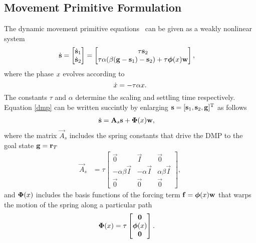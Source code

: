 \subsection{Movement Primitive Formulation}
The dynamic movement primitive equations~\cite{Kober08} can be given as a weakly nonlinear system 
%
\begin{equation}
\begin{aligned}
\dot{\boldsymbol{\mathrm{s}}} &= \begin{bmatrix}
   \dot{\boldsymbol{\mathrm{s}}}_1 \\
   \dot{\boldsymbol{\mathrm{s}}}_2
 \end{bmatrix} = \begin{bmatrix}
    \tau \boldsymbol{\mathrm{s}}_2  \\
    \tau \alpha (\beta(\boldsymbol{\mathrm{g}} - \boldsymbol{\mathrm{s}}_1) - \boldsymbol{\mathrm{s}}_2) + \tau \boldsymbol{\mathrm{\phi}}(x)\boldsymbol{\mathrm{w}}
  \end{bmatrix}
\label{dmp},
\end{aligned}
\end{equation}
%
\noindent where the phase $x$ evolves according to
%
\begin{equation}
\dot{x} = -\tau\alpha x.
\label{phase}
\end{equation}
%
\noindent The constants $\tau$ and $\alpha$ determine the scaling and settling time respectively. Equation \eqref{dmp} can be written succintly by enlarging $\boldsymbol{\mathrm{s}} = [\boldsymbol{\mathrm{s}}_1,\boldsymbol{\mathrm{s}}_2,\boldsymbol{\mathrm{g}}]^{\mathrm{T}}$ as follows
%
\begin{equation}
\begin{aligned}
\dot{\boldsymbol{\mathrm{s}}} &= \boldsymbol{\mathrm{A}}_s \boldsymbol{\mathrm{s}} + \boldsymbol{\mathrm{\Phi}}(x) \boldsymbol{\mathrm{w}},
\label{dmp2}
\end{aligned}
\end{equation}
%
\noindent where the matrix $\vec{A}_s$ includes the spring constants that drive the DMP to the goal state $\boldsymbol{\mathrm{g}} = \boldsymbol{\mathrm{r}}_T$
%
\begin{equation}
\begin{aligned}
\vec{A}_s &= \tau \begin{bmatrix}
    \vec{0} & \vec{I} & \vec{0}  \\
    -\alpha \beta \vec{I}& -\alpha \vec{I} & \alpha \beta \vec{I}\\
    \vec{0} & \vec{0} & \vec{0}
  \end{bmatrix},
\end{aligned}
\label{dmpMatrices1}
\end{equation}
%
\noindent and $\boldsymbol{\mathrm{\Phi}}(x)$ includes the basis functions of the forcing term $\boldsymbol{\mathrm{f}} = \boldsymbol{\mathrm{\phi}}(x)\boldsymbol{\mathrm{w}}$ that warps the motion of the spring along a particular path
%
\begin{equation}
\begin{aligned}
\boldsymbol{\mathrm{\Phi}}(x) &= \tau \begin{bmatrix}
    \boldsymbol{\mathrm{0}} \\
    \boldsymbol{\mathrm{\phi}}(x) \\
    \boldsymbol{\mathrm{0}} 
  \end{bmatrix}.
\label{dmpMatrices2}
\end{aligned}
\end{equation}


